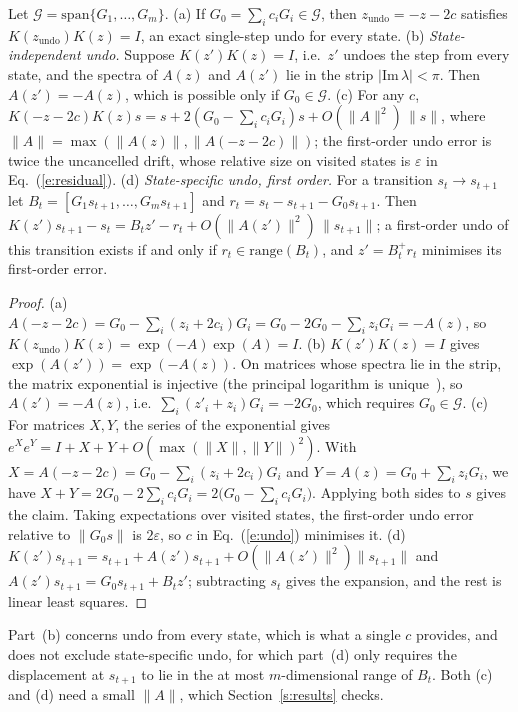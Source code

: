\documentclass{jcse}
\newcommand{\zundo}{z_{\mathrm{undo}}}
\begin{document}
\begin{proposition}
\label{p:undo}
Let $\mathcal{G}=\mathrm{span}\{G_1,\dots,G_m\}$.
(a) If $G_0=\sum_ic_iG_i\in\mathcal{G}$, then $\zundo=-z-2c$ satisfies $K(\zundo)K(z)=I$, an exact single-step undo for every state.
(b) \emph{State-independent undo.} Suppose $K(z')K(z)=I$, i.e.\ $z'$ undoes the step from every state, and the spectra of $A(z)$ and $A(z')$ lie in the strip $|\mathrm{Im}\,\lambda|<\pi$. Then $A(z')=-A(z)$, which is possible only if $G_0\in\mathcal{G}$.
(c) For any $c$, $K(-z-2c)K(z)s=s+2(G_0-\sum_ic_iG_i)s+O(\|A\|^2)\,\|s\|$, where $\|A\|=\max(\|A(z)\|,\|A(-z-2c)\|)$; the first-order undo error is twice the uncancelled drift, whose relative size on visited states is $\varepsilon$ in Eq.~(\ref{e:residual}).
(d) \emph{State-specific undo, first order.} For a transition $s_t\to s_{t+1}$ let $B_t=[G_1s_{t+1},\dots,G_ms_{t+1}]$ and $r_t=s_t-s_{t+1}-G_0s_{t+1}$. Then $K(z')s_{t+1}-s_t=B_tz'-r_t+O(\|A(z')\|^2)\,\|s_{t+1}\|$; a first-order undo of this transition exists if and only if $r_t\in\mathrm{range}(B_t)$, and $z'=B_t^{+}r_t$ minimises its first-order error.
\end{proposition}
\begin{proof}
(a) $A(-z-2c)=G_0-\sum_i(z_i+2c_i)G_i=G_0-2G_0-\sum_iz_iG_i=-A(z)$, so $K(\zundo)K(z)=\exp(-A)\exp(A)=I$.
(b) $K(z')K(z)=I$ gives $\exp(A(z'))=\exp(-A(z))$.
On matrices whose spectra lie in the strip, the matrix exponential is injective (the principal logarithm is unique~\cite{higham2008functions}), so $A(z')=-A(z)$, i.e.\ $\sum_i(z'_i+z_i)G_i=-2G_0$, which requires $G_0\in\mathcal{G}$.
(c) For matrices $X,Y$, the series of the exponential gives $e^Xe^Y=I+X+Y+O(\max(\|X\|,\|Y\|)^2)$.
With $X=A(-z-2c)=G_0-\sum_i(z_i+2c_i)G_i$ and $Y=A(z)=G_0+\sum_iz_iG_i$, we have $X+Y=2G_0-2\sum_ic_iG_i=2\big(G_0-\sum_ic_iG_i\big)$.
Applying both sides to $s$ gives the claim.
Taking expectations over visited states, the first-order undo error relative to $\|G_0s\|$ is $2\varepsilon$, so $c$ in Eq.~(\ref{e:undo}) minimises it.
(d) $K(z')s_{t+1}=s_{t+1}+A(z')s_{t+1}+O(\|A(z')\|^2)\|s_{t+1}\|$ and $A(z')s_{t+1}=G_0s_{t+1}+B_tz'$; subtracting $s_t$ gives the expansion, and the rest is linear least squares.
\end{proof}
Part~(b) concerns undo from every state, which is what a single $c$ provides, and does not exclude state-specific undo, for which part~(d) only requires the displacement at $s_{t+1}$ to lie in the at most $m$-dimensional range of $B_t$.
Both (c) and (d) need a small $\|A\|$, which Section~\ref{s:results} checks.
\end{document}
